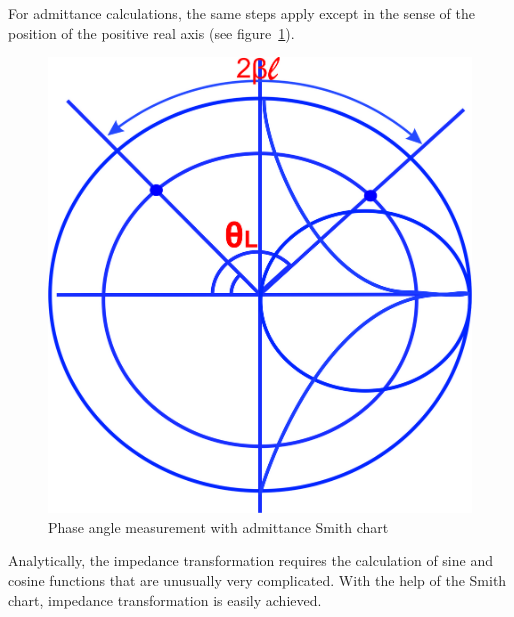 For admittance calculations, the same steps apply except in the sense of the position of the positive real axis (see figure~\ref{fig:dfyui}).
\begin{figure}[h]
\centering
\includegraphics[width=0.7\linewidth]{graphics/dfyui}
\caption{Phase angle measurement with admittance Smith chart}
\label{fig:dfyui}
\end{figure}

Analytically, the impedance transformation requires the calculation of sine and cosine functions that are unusually very complicated. With the help of the Smith chart, impedance transformation is easily achieved.

